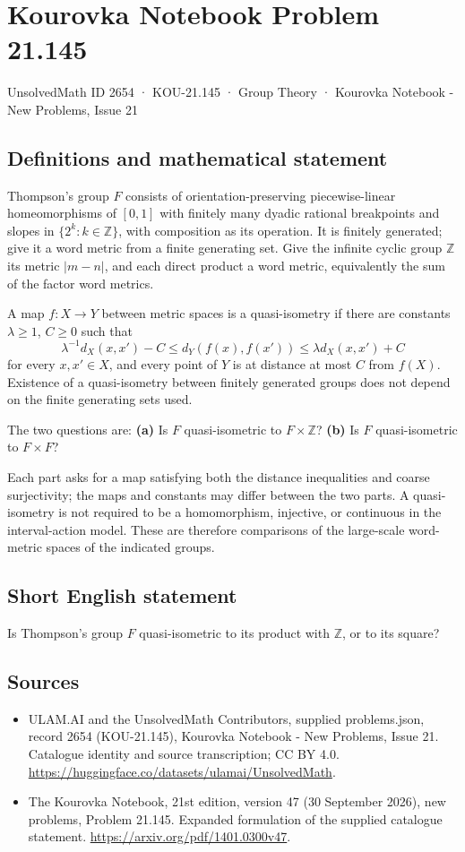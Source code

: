 \documentclass[11pt,a4paper]{article}
\begin{document}
\section*{Kourovka Notebook Problem 21.145}\label{2654}
{\small UnsolvedMath ID 2654 · KOU-21.145 · Group Theory · Kourovka Notebook - New Problems, Issue 21}
\subsection{Definitions and mathematical statement}
Thompson's group $F$ consists of orientation-preserving piecewise-linear homeomorphisms of $[0,1]$ with finitely many dyadic rational breakpoints and slopes in $\{2^k:k\in\mathbb Z\}$, with composition as its operation. It is finitely generated; give it a word metric from a finite generating set. Give the infinite cyclic group $\mathbb Z$ its metric $|m-n|$, and each direct product a word metric, equivalently the sum of the factor word metrics.

A map $f:X\to Y$ between metric spaces is a quasi-isometry if there are constants $\lambda\ge1$, $C\ge0$ such that
\[
 \lambda^{-1}d_X(x,x')-C\le d_Y(f(x),f(x'))
 \le\lambda d_X(x,x')+C
\]
for every $x,x'\in X$, and every point of $Y$ is at distance at most $C$ from $f(X)$. Existence of a quasi-isometry between finitely generated groups does not depend on the finite generating sets used.

The two questions are:
\textbf{(a)} Is $F$ quasi-isometric to $F\times\mathbb Z$?
\textbf{(b)} Is $F$ quasi-isometric to $F\times F$?

Each part asks for a map satisfying both the distance inequalities and coarse surjectivity; the maps and constants may differ between the two parts. A quasi-isometry is not required to be a homomorphism, injective, or continuous in the interval-action model. These are therefore comparisons of the large-scale word-metric spaces of the indicated groups.
\subsection{Short English statement}
Is Thompson’s group $F$ quasi-isometric to its product with $\mathbb Z$, or to its square?
\subsection{Sources}
\begin{itemize}
\item[S1] ULAM.AI and the UnsolvedMath Contributors, supplied problems.json, record 2654 (KOU-21.145), Kourovka Notebook - New Problems, Issue 21. Catalogue identity and source transcription; CC BY 4.0.
\url{https://huggingface.co/datasets/ulamai/UnsolvedMath}.
\item[S2] The Kourovka Notebook, 21st edition, version 47 (30 September 2026), new problems, Problem 21.145. Expanded formulation of the supplied catalogue statement.
\url{https://arxiv.org/pdf/1401.0300v47}.
\end{itemize}
\end{document}
